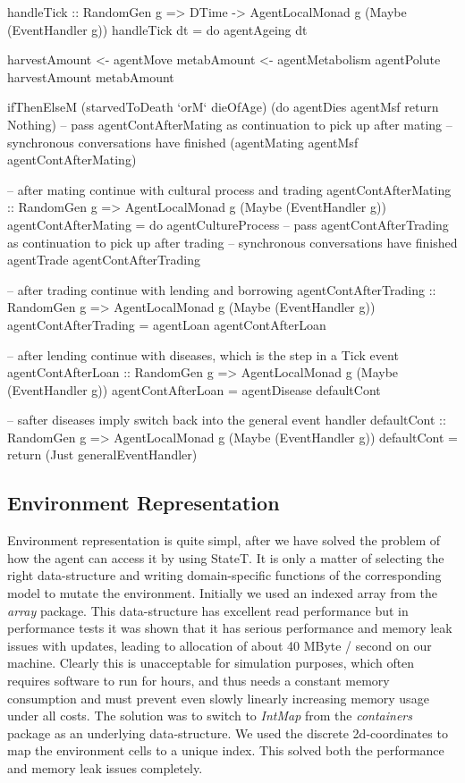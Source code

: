 \begin{HaskellCode}
handleTick :: RandomGen g => DTime -> AgentLocalMonad g (Maybe (EventHandler g))
handleTick dt = do
  agentAgeing dt
  
  harvestAmount <- agentMove
  metabAmount   <- agentMetabolism
  agentPolute harvestAmount metabAmount

  ifThenElseM
    (starvedToDeath `orM` dieOfAge)
    (do
      agentDies agentMsf
      return Nothing) 
    -- pass agentContAfterMating as continuation to pick up after mating
    -- synchronous conversations have finished
    (agentMating agentMsf agentContAfterMating)

-- after mating continue with cultural process and trading
agentContAfterMating :: RandomGen g => AgentLocalMonad g (Maybe (EventHandler g))
agentContAfterMating = do
    agentCultureProcess
    -- pass agentContAfterTrading as continuation to pick up after trading 
    -- synchronous conversations have finished
    agentTrade agentContAfterTrading 

-- after trading continue with lending and borrowing
agentContAfterTrading :: RandomGen g  => AgentLocalMonad g (Maybe (EventHandler g))
agentContAfterTrading = agentLoan agentContAfterLoan

-- after lending continue with diseases, which is the step in a Tick event
agentContAfterLoan :: RandomGen g => AgentLocalMonad g (Maybe (EventHandler g))
agentContAfterLoan = agentDisease defaultCont

-- safter diseases imply switch back into the general event handler
defaultCont :: RandomGen g => AgentLocalMonad g (Maybe (EventHandler g))
defaultCont = return (Just generalEventHandler)
\end{HaskellCode}

\subsection{Environment Representation}
Environment representation is quite simpl, after we have solved the problem of how the agent can access it by using StateT. It is only a matter of selecting the right data-structure and writing domain-specific functions of the corresponding model to mutate the environment. Initially we used an indexed array from the \textit{array} package. This data-structure has excellent read performance but in performance tests it was shown that it has serious performance and memory leak issues with updates, leading to allocation of about 40 MByte / second on our machine. Clearly this is unacceptable for simulation purposes, which often requires software to run for hours, and thus needs a constant memory consumption and must prevent even slowly linearly increasing memory usage under all costs. The solution was to switch to \textit{IntMap} from the \textit{containers} package as an underlying data-structure. We used the discrete 2d-coordinates to map the environment cells to a unique index. This solved both the performance and memory leak issues completely.

